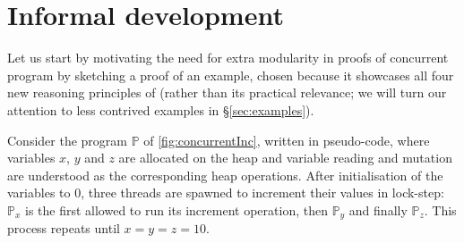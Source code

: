 \section{Informal development}
\label{sec:intuition}

Let us start by motivating the need for extra modularity in proofs of
concurrent program by sketching a proof of an example, chosen because
it showcases all four new reasoning principles of \colosl (rather than
its practical relevance; we will turn our attention to less contrived
examples in \S\ref{sec:examples}).

Consider the program $\mathbb{P}$ of \fig\ref{fig:concurrentInc},
written in pseudo-code, where variables $x$, $y$ and $z$ are allocated
on the heap and variable reading and mutation are understood as the
corresponding heap operations. After initialisation of the variables
to $0$, three threads are spawned to increment their values in
lock-step: $\mathbb{P}_x$ is the first allowed to run its increment
operation, then $\mathbb{P}_y$ and finally $\mathbb{P}_z$. This
process repeats until $x = y = z = 10$.

